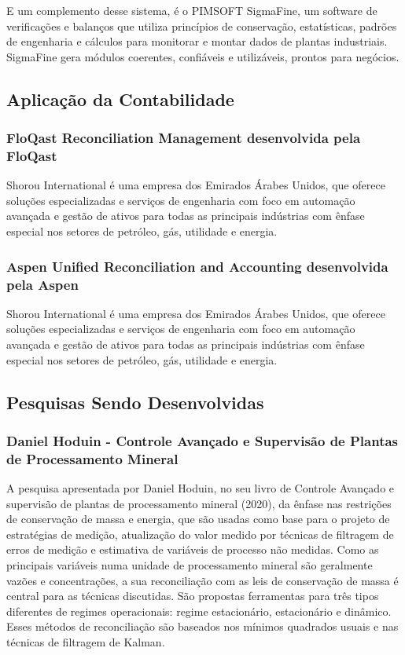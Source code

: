 E um complemento desse sistema, é o PIMSOFT SigmaFine, um software de verificações e balanços que utiliza princípios de conservação, estatísticas, padrões de engenharia e cálculos para monitorar e montar dados de plantas industriais. SigmaFine gera módulos coerentes, confiáveis e utilizáveis, prontos para negócios.

\subsection{Aplicação da Contabilidade}

\subsubsection{FloQast Reconciliation Management desenvolvida pela FloQast}

Shorou International é uma empresa dos Emirados Árabes Unidos, que oferece soluções especializadas e serviços de engenharia com foco em automação avançada e gestão de ativos para todas as principais indústrias com ênfase especial nos setores de petróleo, gás, utilidade e energia.

\subsubsection{Aspen Unified Reconciliation and Accounting desenvolvida pela Aspen}

Shorou International é uma empresa dos Emirados Árabes Unidos, que oferece soluções especializadas e serviços de engenharia com foco em automação avançada e gestão de ativos para todas as principais indústrias com ênfase especial nos setores de petróleo, gás, utilidade e energia.

\subsection{Pesquisas Sendo Desenvolvidas}

\subsubsection{Daniel Hoduin - Controle Avançado e Supervisão de Plantas de Processamento Mineral}

A pesquisa apresentada por Daniel Hoduin, no seu livro de Controle Avançado e supervisão de plantas de processamento mineral (2020), da  ênfase nas restrições de conservação de massa e energia, que são usadas como base para o projeto de estratégias de medição, atualização do valor medido por técnicas de filtragem de erros de medição e estimativa de variáveis de processo não medidas. Como as principais variáveis numa unidade de processamento mineral são geralmente vazões e concentrações, a sua reconciliação com as leis de conservação de massa é central para as técnicas discutidas. São propostas ferramentas para três tipos diferentes de regimes operacionais: regime estacionário, estacionário e dinâmico. Esses métodos de reconciliação são baseados nos mínimos quadrados usuais e nas técnicas de filtragem de Kalman.


